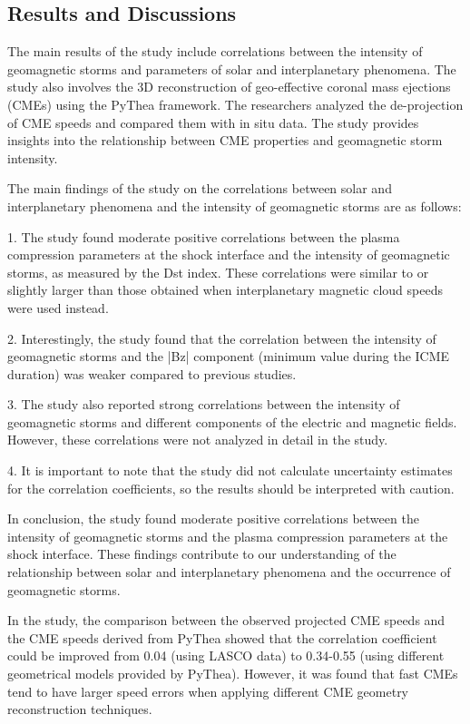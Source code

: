 \subsection{Results and Discussions}
The main results of the study include correlations between the intensity of geomagnetic storms and parameters of solar and interplanetary phenomena. The study also involves the 3D reconstruction of geo-effective coronal mass ejections (CMEs) using the PyThea framework. The researchers analyzed the de-projection of CME speeds and compared them with in situ data. The study provides insights into the relationship between CME properties and geomagnetic storm intensity.

The main findings of the study on the correlations between solar and interplanetary phenomena and the intensity of geomagnetic storms are as follows:

1. The study found moderate positive correlations between the plasma compression parameters at the shock interface and the intensity of geomagnetic storms, as measured by the Dst index. These correlations were similar to or slightly larger than those obtained when interplanetary magnetic cloud speeds were used instead.

2. Interestingly, the study found that the correlation between the intensity of geomagnetic storms and the |Bz| component (minimum value during the ICME duration) was weaker compared to previous studies.

3. The study also reported strong correlations between the intensity of geomagnetic storms and different components of the electric and magnetic fields. However, these correlations were not analyzed in detail in the study.

4. It is important to note that the study did not calculate uncertainty estimates for the correlation coefficients, so the results should be interpreted with caution.

In conclusion, the study found moderate positive correlations between the intensity of geomagnetic storms and the plasma compression parameters at the shock interface. These findings contribute to our understanding of the relationship between solar and interplanetary phenomena and the occurrence of geomagnetic storms.

In the study, the comparison between the observed projected CME speeds and the CME speeds derived from PyThea showed that the correlation coefficient could be improved from 0.04 (using LASCO data) to 0.34-0.55 (using different geometrical models provided by PyThea). However, it was found that fast CMEs tend to have larger speed errors when applying different CME geometry reconstruction techniques.

